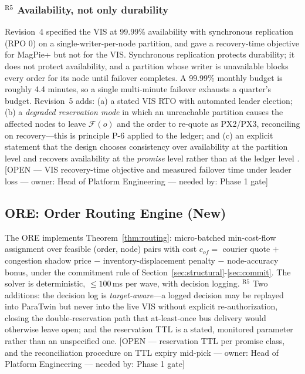 \documentclass[10pt,twocolumn,letterpaper]{article}
\theoremstyle{definition}
\newcommand{\OPEN}[3]{{\color{openred}\footnotesize\textsf{[OPEN --- #1 --- owner: #2 --- needed by: #3]}}}
\begin{document}
\subsubsection*{$^{\mathrm{R5}}$ Availability, not only durability}
Revision~4 specified the VIS at 99.99\% availability with synchronous replication (RPO 0) on a single-writer-per-node partition, and gave a recovery-time objective for MagPie+ but not for the VIS. Synchronous replication protects durability; it does not protect availability, and a partition whose writer is unavailable blocks every order for its node until failover completes. A 99.99\% monthly budget is roughly 4.4 minutes, so a single multi-minute failover exhausts a quarter's budget. Revision~5 adds: (a) a stated VIS RTO with automated leader election; (b) a \emph{degraded reservation mode} in which an unreachable partition causes the affected nodes to leave $\mathcal{F}(o)$ and the order to re-quote as PX2/PX3, reconciling on recovery---this is principle P-6 applied to the ledger; and (c) an explicit statement that the design chooses consistency over availability at the partition level and recovers availability at the \emph{promise} level rather than at the ledger level \cite{gilbert2002}. \OPEN{VIS recovery-time objective and measured failover time under leader loss}{Head of Platform Engineering}{Phase 1 gate}

\subsection{ORE: Order Routing Engine (New)}
The ORE implements Theorem~\ref{thm:routing}: micro-batched min-cost-flow assignment over feasible (order, node) pairs with cost $c_{of}=$ courier quote $+$ congestion shadow price $-$ inventory-displacement penalty $-$ node-accuracy bonus, under the commitment rule of Section~\ref{sec:structural}-\ref{sec:commit}. The solver is deterministic, $\le100$\,ms per wave, with decision logging. $^{\mathrm{R5}}$ Two additions: the decision log is \emph{target-aware}---a logged decision may be replayed into ParaTwin but never into the live VIS without explicit re-authorization, closing the double-reservation path that at-least-once bus delivery would otherwise leave open; and the reservation TTL is a stated, monitored parameter rather than an unspecified one. \OPEN{reservation TTL per promise class, and the reconciliation procedure on TTL expiry mid-pick}{Head of Platform Engineering}{Phase 1 gate}
\end{document}
